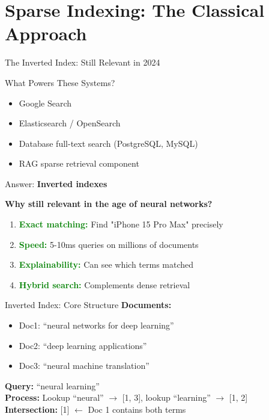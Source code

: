 \documentclass[aspectratio=169]{beamer}
\newif\ifanimated
\newcommand{\cpause}{\ifanimated\pause\fi}
\begin{document}
\section{Sparse Indexing: The Classical Approach}

\begin{frame}{The Inverted Index: Still Relevant in 2024}
\begin{block}{What Powers These Systems?}
\begin{itemize}
    \item Google Search
    \item Elasticsearch / OpenSearch
    \item Database full-text search (PostgreSQL, MySQL)
    \item RAG sparse retrieval component
\end{itemize}
Answer: \textbf{Inverted indexes}
\end{block}
\cpause

\vspace{1em}

\textbf{Why still relevant in the age of neural networks?}
\begin{enumerate}
    \item \textcolor{green}{\textbf{Exact matching:}} Find "iPhone 15 Pro Max" precisely
    \item \textcolor{green}{\textbf{Speed:}} 5-10ms queries on millions of documents
    \item \textcolor{green}{\textbf{Explainability:}} Can see which terms matched
    \item \textcolor{green}{\textbf{Hybrid search:}} Complements dense retrieval
\end{enumerate}
\end{frame}

\begin{frame}[shrink=15]{Inverted Index: Core Structure}
\textbf{Documents:}
\begin{itemize}
    \item Doc1: ``neural networks for deep learning''
    \item Doc2: ``deep learning applications''
    \item Doc3: ``neural machine translation''
\end{itemize}

\vspace{1em}

\begin{center}

\end{center}

\vspace{1em}

\textbf{Query:} ``neural learning'' \\
\textbf{Process:} Lookup ``neural'' $\rightarrow$ [1, 3], lookup ``learning'' $\rightarrow$ [1, 2] \\
\textbf{Intersection:} [1] $\leftarrow$ Doc 1 contains both terms
\end{frame}
\end{document}
